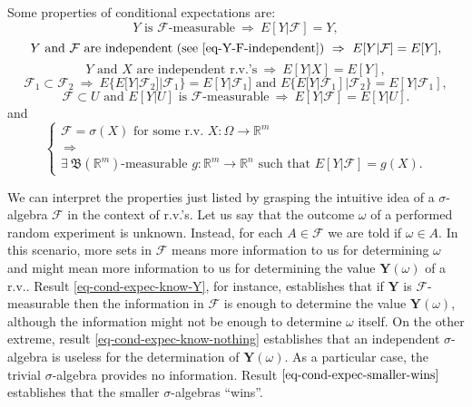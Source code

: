 Some properties of conditional expectations are:
\begin{equation}\label{eq-cond-expec-know-Y}
Y\mbox{ is }\mathcal{F}\mbox{-measurable}
~\Rightarrow~
E[Y|\mathcal{F}]=Y,
\end{equation}
\begin{equation}\label{eq-cond-expec-know-nothing}
Y\mbox{ and }\mathcal{F}\mbox{ are independent (see }\eqref{eq-Y-F-independent}\mbox{)}
~\Rightarrow~
E[Y|\mathcal{F}]=E[Y],
\end{equation}
\begin{equation}\label{eq-cond-expec-independent-rvs}
Y\mbox{ and }X\mbox{ are independent r.v.'s}
~\Rightarrow~
E[Y|X]=E[Y],
\end{equation}
\begin{equation}\label{eq-cond-expec-smaller-wins}
\mathcal{F}_1\subset\mathcal{F}_2
~\Rightarrow~
E\{E[Y|\mathcal{F}_2]|\mathcal{F}_1\} = E[Y|\mathcal{F}_1]\mbox{ and }E\{E[Y|\mathcal{F}_1]|\mathcal{F}_2\} = E[Y|\mathcal{F}_1],
\end{equation}
\begin{equation}\label{eq-cond-expec-f-u}
\mathcal{F}\subset U\mbox{ and }E[Y|U]\mbox{ is }\mathcal{F}\mbox{-measurable}
~\Rightarrow~
E[Y|\mathcal{F}] = E[Y|U].
\end{equation}
and
\begin{equation}\label{eq-cond-expec-exists-g}
\left\{
\begin{array}{c}
\mathcal{F}=\sigma(X)\mbox{ for some r.v. }X:\Omega\rightarrow\mathbb{R}^m \\
~\Rightarrow~ \\
\exists~\mathfrak{B}(\mathbb{R}^m)\mbox{-measurable }g:\mathbb{R}^m\rightarrow\mathbb{R}^n\mbox{ such that }E[Y|\mathcal{F}] = g(X).
\end{array}
\right.
\end{equation}

We can interpret the properties just listed by grasping the intuitive idea of a $\sigma$-algebra $\mathcal{F}$ in the context of r.v.'s.
Let us say that the outcome $\omega$ of a performed random experiment is unknown. Instead, for each $A\in\mathcal{F}$ we are told if $\omega\in A$.
In this scenario, more sets in $\mathcal{F}$ means more information to us for determining $\omega$ and might mean more information to us for determining the value $\mathbf{Y}(\omega)$ of a r.v..
Result \eqref{eq-cond-expec-know-Y}, for instance, establishes that if $\mathbf{Y}$ is $\mathcal{F}$-measurable then the information in $\mathcal{F}$ is enough to determine the value $\mathbf{Y}(\omega)$,
although the information might not be enough to determine $\omega$ itself.
On the other extreme, result \eqref{eq-cond-expec-know-nothing} establishes that an independent $\sigma$-algebra is useless for the determination of $\mathbf{Y}(\omega)$.
As a particular case, the trivial $\sigma$-algebra provides no information.
Result $\eqref{eq-cond-expec-smaller-wins}$ establishes that the smaller $\sigma$-algebras ``wins''.

